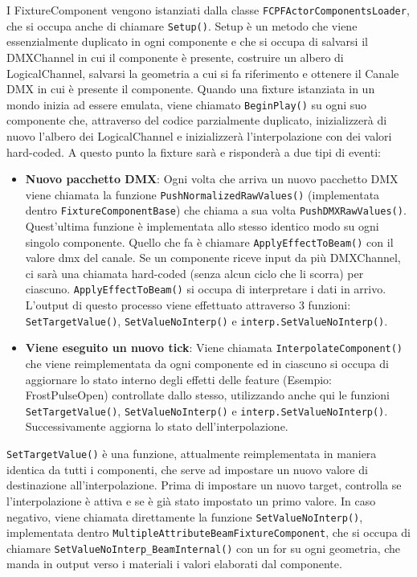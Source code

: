 \documentclass[main.tex]{subfiles}
\begin{document}
I FixtureComponent vengono istanziati dalla classe \lstinline{FCPFActorComponentsLoader}, che si occupa anche di chiamare \lstinline{Setup()}. Setup è un metodo che viene essenzialmente duplicato in ogni componente e che si occupa di salvarsi il DMXChannel in cui il componente è presente, costruire un albero di LogicalChannel, salvarsi la geometria a cui si fa riferimento e ottenere il Canale DMX in cui è presente il componente. Quando una fixture istanziata in un mondo inizia ad essere emulata, viene chiamato \lstinline{BeginPlay()} su ogni suo componente che, attraverso del codice parzialmente duplicato, inizializzerà di nuovo l'albero dei LogicalChannel e inizializzerà l'interpolazione con dei valori hard-coded. A questo punto la fixture sarà  e risponderà a due tipi di eventi:
\begin{itemize}
    \item \textbf{Nuovo pacchetto DMX}: Ogni volta che arriva un nuovo pacchetto DMX viene chiamata la funzione \lstinline{PushNormalizedRawValues()} (implementata dentro \lstinline{FixtureComponentBase}) che chiama a sua volta \lstinline{PushDMXRawValues()}. Quest'ultima funzione è implementata allo stesso identico modo su ogni singolo componente. Quello che fa è chiamare \lstinline{ApplyEffectToBeam()} con il valore dmx del canale. Se un componente riceve input da più DMXChannel, ci sarà una chiamata hard-coded (senza alcun ciclo che li scorra) per ciascuno. \lstinline{ApplyEffectToBeam()} si occupa di interpretare i dati in arrivo. L'output di questo processo viene effettuato attraverso 3 funzioni: \lstinline{SetTargetValue()}, \lstinline{SetValueNoInterp()} e \lstinline{interp.SetValueNoInterp()}.
    \item \textbf{Viene eseguito un nuovo tick}: Viene chiamata \lstinline{InterpolateComponent()} che viene reimplementata da ogni componente ed in ciascuno si occupa di aggiornare lo stato interno degli effetti delle feature (Esempio: FrostPulseOpen) controllate dallo stesso, utilizzando anche qui le funzioni \lstinline{SetTargetValue()}, \lstinline{SetValueNoInterp()} e \lstinline{interp.SetValueNoInterp()}. Successivamente aggiorna lo stato dell'interpolazione.
\end{itemize}
\lstinline{SetTargetValue()} è una funzione, attualmente reimplementata in maniera identica da tutti i componenti, che serve ad impostare un nuovo valore di destinazione all'interpolazione. Prima di impostare un nuovo target, controlla se l'interpolazione è attiva e se è già stato impostato un primo valore. In caso negativo, viene chiamata direttamente la funzione \lstinline{SetValueNoInterp()}, implementata dentro \lstinline{MultipleAttributeBeamFixtureComponent}, che si occupa di chiamare \lstinline{SetValueNoInterp_BeamInternal()} con un for su ogni geometria, che manda in output verso i materiali i valori elaborati dal componente.
\end{document}
